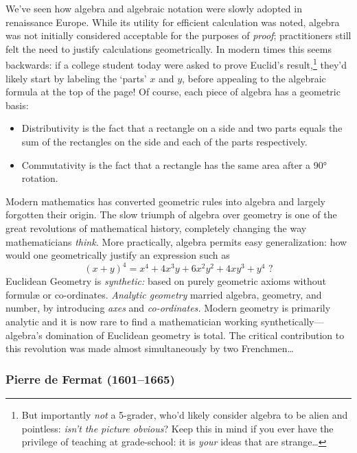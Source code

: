 We've seen how algebra and algebraic notation were slowly adopted in renaissance Europe. While its utility for efficient calculation was noted, algebra was not initially considered acceptable for the purposes of \emph{proof}; practitioners still felt the need to justify calculations geometrically. In modern times this seems backwards: if a college student today were asked to prove Euclid's result,\footnote{%
	But importantly \emph{not} a 5\th-grader, who'd likely consider algebra to be alien and pointless: \emph{isn't the picture obvious}? Keep this in mind if you ever have the privilege of teaching at grade-school: it is \emph{your} ideas that are strange\ldots 
}
they'd likely start by labeling the `parts' $x$ and $y$, before appealing to the algebraic formula at the top of the page! Of course, each piece of algebra has a geometric basis:
\begin{itemize}
  \item Distributivity is the fact that a rectangle on a side and two parts equals the sum of the rectangles on the side and each of the parts respectively.
  \item Commutativity is the fact that a rectangle has the same area after a \ang{90} rotation.
\end{itemize}
Modern mathematics has converted geometric rules into algebra and largely forgotten their origin. The slow triumph of algebra over geometry is one of the great revolutions of mathematical history, completely changing the way mathematicians \emph{think.} More practically, algebra permits easy generalization: how would one geometrically justify an expression such as
\[
	(x+y)^4=x^4+4x^3y+6x^2y^2+4xy^3+y^4\text{ ?}
\]
Euclidean Geometry is \emph{synthetic:} based on purely geometric axioms without formulæ or co-ordinates. \emph{Analytic geometry} married algebra, geometry, and number, by introducing \emph{axes} and \emph{co-ordinates.} Modern geometry is primarily analytic and it is now rare to find a mathematician working synthetically---algebra's domination of Euclidean geometry is total. The critical contribution to this revolution was made almost simultaneously by two Frenchmen\ldots


\pagebreak[3]


\subsubsection*{Pierre de Fermat (1601--1665)} 

